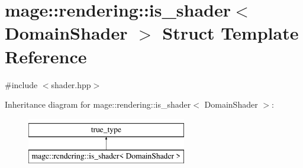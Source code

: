 \hypertarget{structmage_1_1rendering_1_1is__shader_3_01_domain_shader_01_4}{}\section{mage\+:\+:rendering\+:\+:is\+\_\+shader$<$ Domain\+Shader $>$ Struct Template Reference}
\label{structmage_1_1rendering_1_1is__shader_3_01_domain_shader_01_4}


{\ttfamily \#include $<$shader.\+hpp$>$}

Inheritance diagram for mage\+:\+:rendering\+:\+:is\+\_\+shader$<$ Domain\+Shader $>$\+:\begin{figure}[H]
\begin{center}
\leavevmode
\includegraphics[height=2.000000cm]{structmage_1_1rendering_1_1is__shader_3_01_domain_shader_01_4}
\end{center}
\end{figure}
